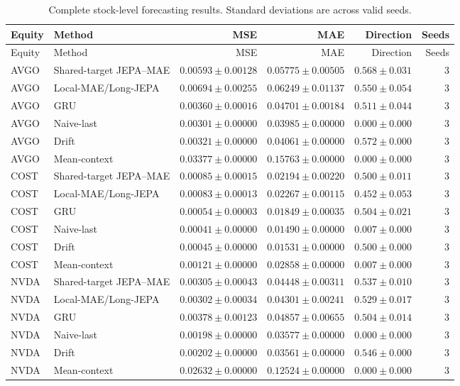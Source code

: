 \begin{longtable}{llrrrr}
\caption{Complete stock-level forecasting results. Standard deviations are across valid seeds.}\label{tab:appendix_stock_metrics}\\
\toprule
Equity & Method & MSE & MAE & Direction & Seeds \\
\midrule
\endfirsthead
\toprule
Equity & Method & MSE & MAE & Direction & Seeds \\
\midrule
\endhead
AVGO & Shared-target JEPA--MAE & $0.00593 \pm 0.00128$ & $0.05775 \pm 0.00505$ & $0.568 \pm 0.031$ & 3 \\
AVGO & Local-MAE/Long-JEPA & $0.00694 \pm 0.00255$ & $0.06249 \pm 0.01137$ & $0.550 \pm 0.054$ & 3 \\
AVGO & GRU & $0.00360 \pm 0.00016$ & $0.04701 \pm 0.00184$ & $0.511 \pm 0.044$ & 3 \\
AVGO & Naive-last & $0.00301 \pm 0.00000$ & $0.03985 \pm 0.00000$ & $0.000 \pm 0.000$ & 3 \\
AVGO & Drift & $0.00321 \pm 0.00000$ & $0.04061 \pm 0.00000$ & $0.572 \pm 0.000$ & 3 \\
AVGO & Mean-context & $0.03377 \pm 0.00000$ & $0.15763 \pm 0.00000$ & $0.000 \pm 0.000$ & 3 \\
COST & Shared-target JEPA--MAE & $0.00085 \pm 0.00015$ & $0.02194 \pm 0.00220$ & $0.500 \pm 0.011$ & 3 \\
COST & Local-MAE/Long-JEPA & $0.00083 \pm 0.00013$ & $0.02267 \pm 0.00115$ & $0.452 \pm 0.053$ & 3 \\
COST & GRU & $0.00054 \pm 0.00003$ & $0.01849 \pm 0.00035$ & $0.504 \pm 0.021$ & 3 \\
COST & Naive-last & $0.00041 \pm 0.00000$ & $0.01490 \pm 0.00000$ & $0.007 \pm 0.000$ & 3 \\
COST & Drift & $0.00045 \pm 0.00000$ & $0.01531 \pm 0.00000$ & $0.500 \pm 0.000$ & 3 \\
COST & Mean-context & $0.00121 \pm 0.00000$ & $0.02858 \pm 0.00000$ & $0.007 \pm 0.000$ & 3 \\
NVDA & Shared-target JEPA--MAE & $0.00305 \pm 0.00043$ & $0.04448 \pm 0.00311$ & $0.537 \pm 0.010$ & 3 \\
NVDA & Local-MAE/Long-JEPA & $0.00302 \pm 0.00034$ & $0.04301 \pm 0.00241$ & $0.529 \pm 0.017$ & 3 \\
NVDA & GRU & $0.00378 \pm 0.00123$ & $0.04857 \pm 0.00655$ & $0.504 \pm 0.014$ & 3 \\
NVDA & Naive-last & $0.00198 \pm 0.00000$ & $0.03577 \pm 0.00000$ & $0.000 \pm 0.000$ & 3 \\
NVDA & Drift & $0.00202 \pm 0.00000$ & $0.03561 \pm 0.00000$ & $0.546 \pm 0.000$ & 3 \\
NVDA & Mean-context & $0.02632 \pm 0.00000$ & $0.12524 \pm 0.00000$ & $0.000 \pm 0.000$ & 3 \\
\bottomrule
\end{longtable}
